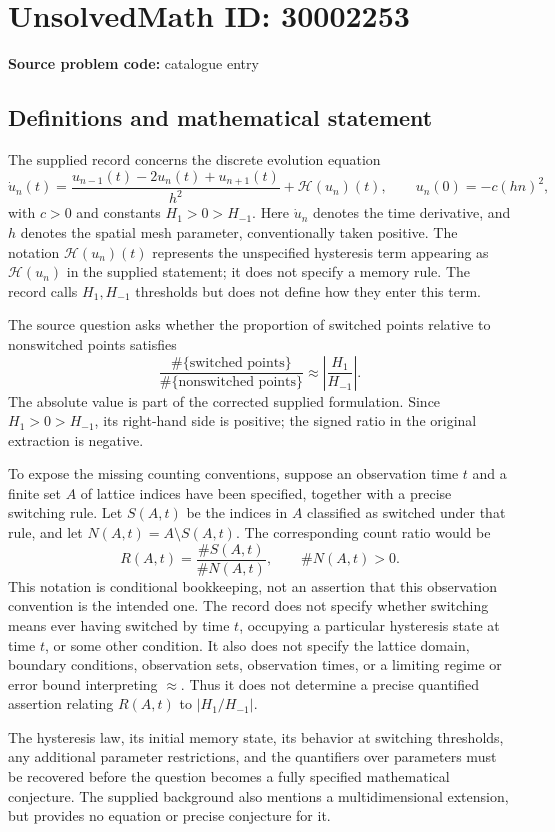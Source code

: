 \documentclass[11pt]{article}
\begin{document}
\section*{UnsolvedMath ID: 30002253}
\textbf{Source problem code:} catalogue entry
\subsection{Definitions and mathematical statement}
The supplied record concerns the discrete evolution equation
\[
\dot u_n(t)=\frac{u_{n-1}(t)-2u_n(t)+u_{n+1}(t)}{h^2}+\mathcal H(u_n)(t),
\qquad
u_n(0)=-c(hn)^2,
\]
with \(c>0\) and constants \(H_1>0>H_{-1}\). Here \(\dot u_n\) denotes the time derivative, and \(h\) denotes the spatial mesh parameter, conventionally taken positive. The notation \(\mathcal H(u_n)(t)\) represents the unspecified hysteresis term appearing as \(\mathcal H(u_n)\) in the supplied statement; it does not specify a memory rule. The record calls \(H_1,H_{-1}\) thresholds but does not define how they enter this term.

The source question asks whether the proportion of switched points relative to nonswitched points satisfies
\[
\frac{\#\{\text{switched points}\}}{\#\{\text{nonswitched points}\}}
\approx
\left|\frac{H_1}{H_{-1}}\right|.
\]
The absolute value is part of the corrected supplied formulation. Since \(H_1>0>H_{-1}\), its right-hand side is positive; the signed ratio in the original extraction is negative.

To expose the missing counting conventions, suppose an observation time \(t\) and a finite set \(A\) of lattice indices have been specified, together with a precise switching rule. Let \(S(A,t)\) be the indices in \(A\) classified as switched under that rule, and let \(N(A,t)=A\setminus S(A,t)\). The corresponding count ratio would be
\[
R(A,t)=\frac{\#S(A,t)}{\#N(A,t)},
\qquad \#N(A,t)>0.
\]
This notation is conditional bookkeeping, not an assertion that this observation convention is the intended one. The record does not specify whether switching means ever having switched by time \(t\), occupying a particular hysteresis state at time \(t\), or some other condition. It also does not specify the lattice domain, boundary conditions, observation sets, observation times, or a limiting regime or error bound interpreting \(\approx\). Thus it does not determine a precise quantified assertion relating \(R(A,t)\) to \(\lvert H_1/H_{-1}\rvert\).

The hysteresis law, its initial memory state, its behavior at switching thresholds, any additional parameter restrictions, and the quantifiers over parameters must be recovered before the question becomes a fully specified mathematical conjecture. The supplied background also mentions a multidimensional extension, but provides no equation or precise conjecture for it.
\end{document}

